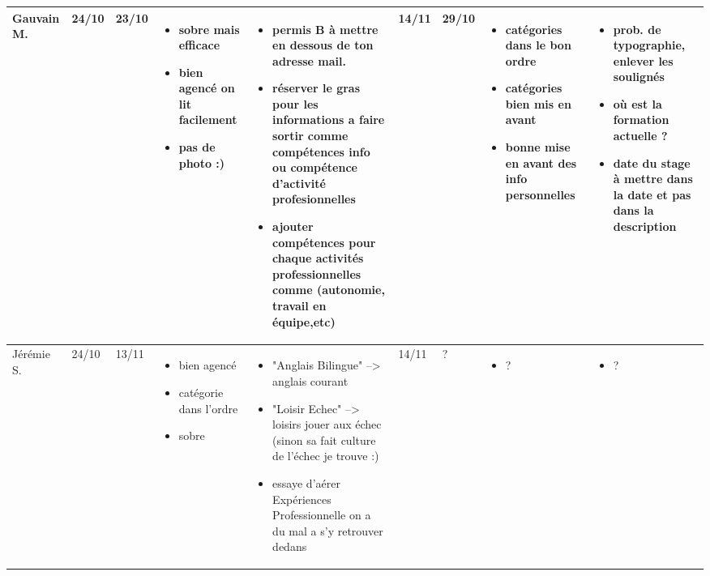 \documentclass[a4paper,11pt]{article}
\begin{document}
\begin{landscape}
\begin{longtable}{|l|l|l|p{4cm}|p{4cm}|l|l|p{4cm}|p{4cm}|}
    Gauvain M. 	& 24/10 & 23/10 
		& \begin{itemize}
		  \item sobre mais efficace
		  \item bien agencé on lit facilement
		  \item pas de photo :)
		  \end{itemize}
		& \begin{itemize}
		  \item permis B à mettre en dessous de ton adresse mail.
		  \item réserver le gras pour les informations a faire sortir comme compétences info ou compétence d'activité profesionnelles
		  \item ajouter compétences pour chaque activités professionnelles comme (autonomie, travail en équipe,etc)
		  \end{itemize}
		& 14/11 & 29/10
		& \begin{itemize}
		  \item catégories dans le bon ordre
		  \item catégories bien mis en avant
		  \item bonne mise en avant des info personnelles
		  \end{itemize} 
		& \begin{itemize}
		  \item prob. de typographie, enlever les soulignés
		  \item où est la formation actuelle ?
		  \item date du stage à mettre dans la date et pas dans la description
		  \end{itemize} \\ \hline

    Jérémie S.  & 24/10 & 13/11
		& \begin{itemize}
		  \item bien agencé
		  \item catégorie dans l'ordre
		  \item sobre
		  \end{itemize}
		& \begin{itemize}
		  \item "Anglais Bilingue" --> anglais courant
		  \item "Loisir Echec" --> loisirs jouer aux échec (sinon sa fait culture de l’échec je trouve :)
		  \item essaye d'aérer Expériences Professionnelle on a du mal a s'y retrouver dedans
		  \end{itemize} 
		& 14/11 & ?
		& \begin{itemize}
		  \item ?
		  \end{itemize}
		& \begin{itemize}
		  \item ?
		  \end{itemize} \\ \hline


\end{longtable}
\end{landscape}
\end{document}
